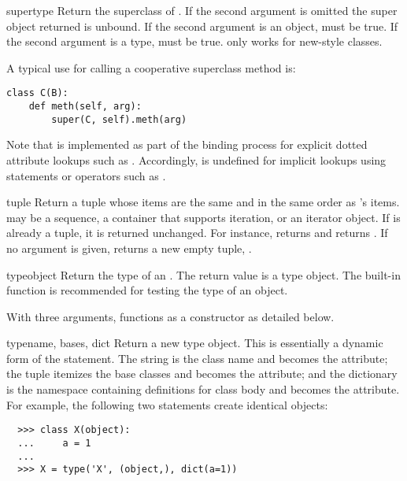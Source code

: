 \begin{funcdesc}{super}{type}
  Return the superclass of .  If the second argument is omitted
  the super object returned is unbound.  If the second argument is an
  object,  must be true.  If
  the second argument is a type,  must be true.
   only works for new-style classes.

  A typical use for calling a cooperative superclass method is:
\begin{verbatim}
class C(B):
    def meth(self, arg):
        super(C, self).meth(arg)
\end{verbatim}

  Note that  is implemented as part of the binding process for
  explicit dotted attribute lookups such as
  .  Accordingly,  is
  undefined for implicit lookups using statements or operators such as
  .
\end{funcdesc}

\begin{funcdesc}{tuple}{}
  Return a tuple whose items are the same and in the same order as
  's items.   may be a sequence, a
  container that supports iteration, or an iterator object.
  If  is already a tuple, it
  is returned unchanged.  For instance,  returns
   and  returns
  .  If no argument is given, returns a new empty
  tuple, \code{()}.
\end{funcdesc}

\begin{funcdesc}{type}{object}
  Return the type of an .  The return value is a
  type object.  The  built-in
  function is recommended for testing the type of an object.

  With three arguments,  functions as a constructor
  as detailed below.
\end{funcdesc}

\begin{funcdescni}{type}{name, bases, dict}
  Return a new type object.  This is essentially a dynamic form of the
   statement. The  string is the class name
  and becomes the  attribute; the  tuple
  itemizes the base classes and becomes the 
  attribute; and the  dictionary is the namespace containing
  definitions for class body and becomes the 
  attribute.  For example, the following two statements create
  identical  objects:

\begin{verbatim}
  >>> class X(object):
  ...     a = 1
  ...     
  >>> X = type('X', (object,), dict(a=1))
\end{verbatim}
\end{funcdescni}

